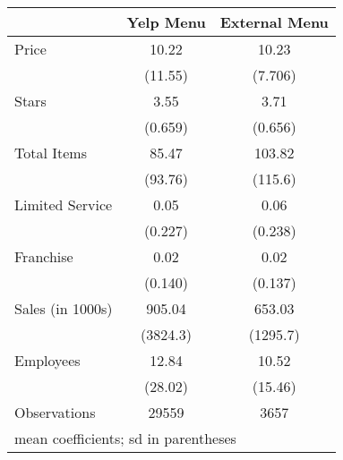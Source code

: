 \begin{tabular}{l*{2}{c}}
\hline\hline
                    &\multicolumn{1}{c}{Yelp Menu}&\multicolumn{1}{c}{External Menu}\\
\hline
Price               &       10.22&       10.23\\
                    &     (11.55)&     (7.706)\\
[1em]
Stars               &        3.55&        3.71\\
                    &     (0.659)&     (0.656)\\
[1em]
Total Items         &       85.47&      103.82\\
                    &     (93.76)&     (115.6)\\
[1em]
Limited Service     &        0.05&        0.06\\
                    &     (0.227)&     (0.238)\\
[1em]
Franchise           &        0.02&        0.02\\
                    &     (0.140)&     (0.137)\\
[1em]
Sales (in 1000s)    &      905.04&      653.03\\
                    &    (3824.3)&    (1295.7)\\
[1em]
Employees           &       12.84&       10.52\\
                    &     (28.02)&     (15.46)\\
\hline
Observations        &       29559&        3657\\
\hline\hline
\multicolumn{3}{l}{\footnotesize mean coefficients; sd in parentheses}\\
\end{tabular}
